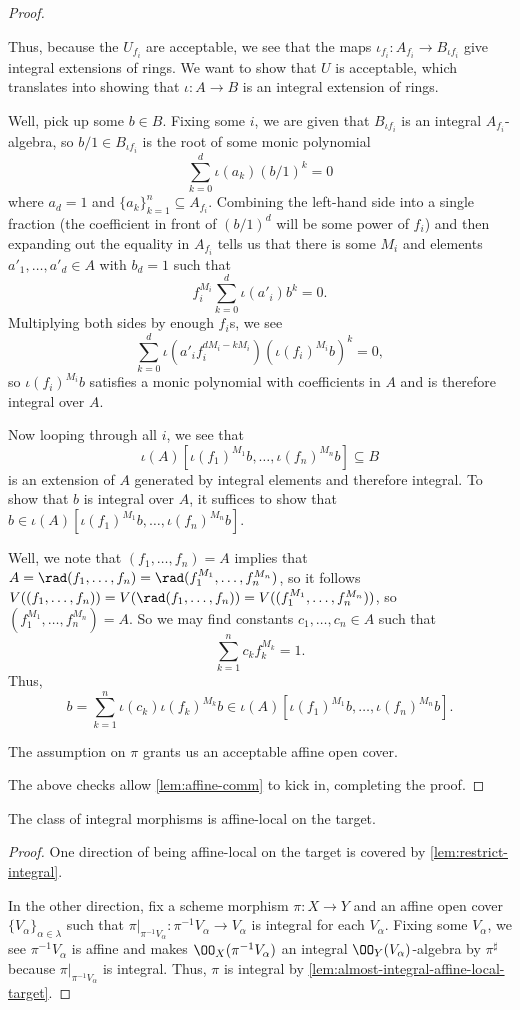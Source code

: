 \documentclass[../notes.tex]{subfiles}
\begin{document}
\begin{proof}
\begin{listroman}
		Thus, because the $U_{f_i}$ are acceptable, we see that the maps $\iota_{f_i}\colon A_{f_i}\to B_{\iota f_i}$ give integral extensions of rings. We want to show that $U$ is acceptable, which translates into showing that $\iota\colon A\to B$ is an integral extension of rings.

		Well, pick up some $b\in B$. Fixing some $i$, we are given that $B_{\iota f_i}$ is an integral $A_{f_i}$-algebra, so $b/1\in B_{\iota f_i}$ is the root of some monic polynomial
		\[\sum_{k=0}^d\iota(a_k)(b/1)^k=0\]
		where $a_d=1$ and $\{a_k\}_{k=1}^n\subseteq A_{f_i}$. Combining the left-hand side into a single fraction (the coefficient in front of $(b/1)^d$ will be some power of $f_i$) and then expanding out the equality in $A_{f_i}$ tells us that there is some $M_i$ and elements $a'_1,\ldots,a'_d\in A$ with $b_d=1$ such that
		\[f_i^{M_i}\sum_{k=0}^d\iota(a'_i)b^k=0.\]
		Multiplying both sides by enough $f_i$s, we see
		\[\sum_{k=0}^d\iota\left(a'_if_i^{dM_i-kM_i}\right)\left(\iota(f_i)^{M_i}b\right)^k=0,\]
		so $\iota(f_i)^{M_i}b$ satisfies a monic polynomial with coefficients in $A$ and is therefore integral over $A$.

		Now looping through all $i$, we see that
		\[\iota(A)\left[\iota(f_1)^{M_1}b,\ldots,\iota(f_n)^{M_n}b\right]\subseteq B\]
		is an extension of $A$ generated by integral elements and therefore integral. To show that $b$ is integral over $A$, it suffices to show that $b\in\iota(A)\left[\iota(f_1)^{M_1}b,\ldots,\iota(f_n)^{M_n}b\right]$.

		Well, we note that $(f_1,\ldots,f_n)=A$ implies that $A=\rad(f_1,\ldots,f_n)=\rad(f_1^{M_1},\ldots,f_n^{M_n})$, so it follows $V((f_1,\ldots,f_n))=V(\rad(f_1,\ldots,f_n))=V((f_1^{M_1},\ldots,f_n^{M_n}))$, so $(f_1^{M_1},\ldots,f_n^{M_n})=A$. So we may find constants $c_1,\ldots,c_n\in A$ such that
		\[\sum_{k=1}^nc_kf_k^{M_k}=1.\]
		Thus,
		\[b=\sum_{k=1}^n\iota(c_k)\iota(f_k)^{M_k}b\in\iota(A)\left[\iota(f_1)^{M_1}b,\ldots,\iota(f_n)^{M_n}b\right].\]
		\item The assumption on $\pi$ grants us an acceptable affine open cover.
	\end{listroman}
	The above checks allow \autoref{lem:affine-comm} to kick in, completing the proof.
\end{proof}
\begin{corollary} \label{cor:integral-affine-local-target}
	The class of integral morphisms is affine-local on the target.
\end{corollary}
\begin{proof}
	One direction of being affine-local on the target is covered by \autoref{lem:restrict-integral}.

	In the other direction, fix a scheme morphism $\pi\colon X\to Y$ and an affine open cover $\{V_\alpha\}_{\alpha\in\lambda}$ such that $\pi|_{\pi^{-1}V_\alpha}\colon\pi^{-1}V_\alpha\to V_\alpha$ is integral for each $V_\alpha$. Fixing some $V_\alpha$, we see $\pi^{-1}V_\alpha$ is affine and makes $\OO_X(\pi^{-1}V_\alpha)$ an integral $\OO_Y(V_\alpha)$-algebra by $\pi^\sharp$ because $\pi|_{\pi^{-1}V_\alpha}$ is integral. Thus, $\pi$ is integral by \autoref{lem:almost-integral-affine-local-target}.
\end{proof}
\end{document}
